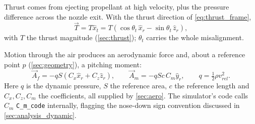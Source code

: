 Thrust comes from ejecting propellant at high velocity, plus the pressure difference across the
nozzle exit. With the thrust direction of \autoref{eq:thrust_frame},
\begin{equation}
    \vec{T} = T\hat{x}_t = T\left(\cos\theta_t\,\hat{x}_r - \sin\theta_t\,\hat{z}_r\right),
\end{equation}
with $T$ the thrust magnitude (\autoref{sec:thrust}); $\theta_t$ carries the whole misalignment.

Motion through the air produces an aerodynamic force and, about a reference point $p$
(\autoref{sec:geometry}), a pitching moment:
\begin{equation}\label{eq:aero_magnitudes}
    \vec{A}_f = -qS\left(C_x\hat{x}_r + C_z\hat{z}_r\right), \qquad
    \vec{A}_m = -qSc\,C_m\hat{y}_r, \qquad
    q = \tfrac12\rho v_{rel}^2.
\end{equation}
Here $q$ is the dynamic pressure, $S$ the reference area, $c$ the reference length and
$C_x,C_z,C_m$ the coefficients, all supplied by \autoref{sec:aero}. The simulator's code calls $C_m$
\texttt{C\_m\_code} internally, flagging the nose-down sign convention discussed in
\autoref{sec:analysis_dynamic}.


